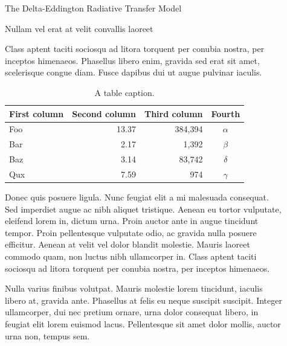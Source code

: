 \documentclass[final]{beamer}
\newlength{\sepwidth}
\newlength{\colwidth}
\newcommand{\separatorcolumn}{\begin{column}{\sepwidth}\end{column}}
\begin{document}
\begin{frame}[t,fragile]
\begin{columns}[t]
\begin{column}{\colwidth}
\begin{block}{The Delta-Eddington Radiative Transfer Model}
  \end{block}

 \begin{block}{Nullam vel erat at velit convallis laoreet}

    Class aptent taciti sociosqu ad litora torquent per conubia nostra, per
    inceptos himenaeos. Phasellus libero enim, gravida sed erat sit amet,
    scelerisque congue diam. Fusce dapibus dui ut augue pulvinar iaculis.

    \begin{table}
      \centering
      \begin{tabular}{l r r c}
        \toprule
        \textbf{First column} & \textbf{Second column} & \textbf{Third column} & \textbf{Fourth} \\
        \midrule
        Foo & 13.37 & 384,394 & $\alpha$ \\
        Bar & 2.17 & 1,392 & $\beta$ \\
        Baz & 3.14 & 83,742 & $\delta$ \\
        Qux & 7.59 & 974 & $\gamma$ \\
        \bottomrule
      \end{tabular}
      \caption{A table caption.}
    \end{table}

    Donec quis posuere ligula. Nunc feugiat elit a mi malesuada consequat. Sed
    imperdiet augue ac nibh aliquet tristique. Aenean eu tortor vulputate,
    eleifend lorem in, dictum urna. Proin auctor ante in augue tincidunt
    tempor. Proin pellentesque vulputate odio, ac gravida nulla posuere
    efficitur. Aenean at velit vel dolor blandit molestie. Mauris laoreet
    commodo quam, non luctus nibh ullamcorper in. Class aptent taciti sociosqu
    ad litora torquent per conubia nostra, per inceptos himenaeos.

    Nulla varius finibus volutpat. Mauris molestie lorem tincidunt, iaculis
    libero at, gravida ante. Phasellus at felis eu neque suscipit suscipit.
    Integer ullamcorper, dui nec pretium ornare, urna dolor consequat libero,
    in feugiat elit lorem euismod lacus. Pellentesque sit amet dolor mollis,
    auctor urna non, tempus sem.

  \end{block}

\end{column}

\separatorcolumn

\begin{column}{\colwidth}


\end{column}
\end{columns}
\end{frame}
\end{document}
